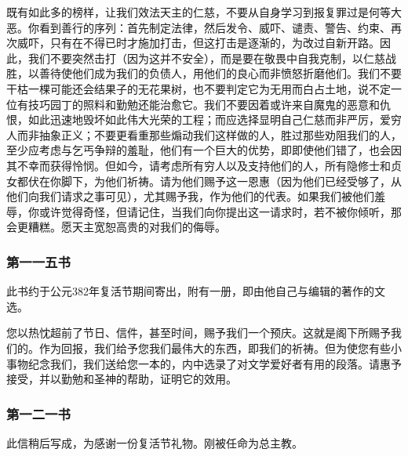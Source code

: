 既有如此多的榜样，让我们效法天主的仁慈，不要从自身学习到报复罪过是何等大恶。你看到善行的序列：首先制定法律，然后发令、威吓、谴责、警告、约束、再次威吓，只有在不得已时才施加打击，但这打击是逐渐的，为改过自新开路。因此，我们不要突然击打（因为这并不安全），而是要在敬畏中自我克制，以仁慈战胜，以善待使他们成为我们的负债人，用他们的良心而非愤怒折磨他们。我们不要干枯一棵可能还会结果子的无花果树，也不要判定它为无用而白占土地，说不定一位有技巧园丁的照料和勤勉还能治愈它。我们不要因着或许来自魔鬼的恶意和仇恨，如此迅速地毁坏如此伟大光荣的工程；而应选择显明自己仁慈而非严厉，爱穷人而非抽象正义；不要更看重那些煽动我们这样做的人，胜过那些劝阻我们的人，至少应考虑与乞丐争辩的羞耻，他们有一个巨大的优势，即即使他们错了，也会因其不幸而获得怜悯。但如今，请考虑所有穷人以及支持他们的人，所有隐修士和贞女都伏在你脚下，为他们祈祷。请为他们赐予这一恩惠（因为他们已经受够了，从他们向我们请求之事可见），尤其赐予我，作为他们的代表。如果我们被他们羞辱，你或许觉得奇怪，但请记住，当我们向你提出这一请求时，若不被你倾听，那会更糟糕。愿天主宽恕高贵的对我们的侮辱。\par


\subsubsection{第一一五书}

此书约于公元382年复活节期间寄出，附有一册，即由他自己与编辑的著作的文选。\par

您以热忱超前了节日、信件，甚至时间，赐予我们一个预庆。这就是阁下所赐予我们的。作为回报，我们给予您我们最伟大的东西，即我们的祈祷。但为使您有些小事物纪念我们，我们送给您一本的，内中选录了对文学爱好者有用的段落。请惠予接受，并以勤勉和圣神的帮助，证明它的效用。\par


\subsubsection{第一二一书}

此信稍后写成，为感谢一份复活节礼物。刚被任命为总主教。\par


